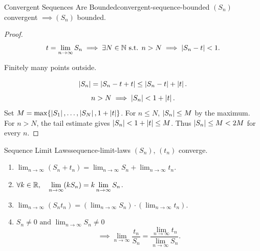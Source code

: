 \begin{theorem}{Convergent Sequences Are Bounded}{convergent-sequence-bounded}
  $(S_n)$ convergent $\implies (S_n)$ bounded.
\end{theorem}

\begin{proof}
  \[
    t=\lim_{n\to\infty}S_n
    \implies\exists N\in\mathbb{N}\text{ s.t. }n>N\implies\left\lvert S_n-t \right\rvert<1.
  \]
  \begin{thinking}[Why]
    \begin{center}
    \end{center}
    Finitely many points outside.
  \end{thinking}
  \[
    \left\lvert S_n \right\rvert=\left\lvert S_n-t+t \right\rvert\le\left\lvert S_n-t \right\rvert+\left\lvert t \right\rvert.
  \]
  \[
    n>N\implies\left\lvert S_n \right\rvert<1+\left\lvert t \right\rvert.
  \]
  Set $M=\max\{\left\lvert S_1 \right\rvert,\ldots,\left\lvert S_N \right\rvert,1+\left\lvert t \right\rvert\}$.
  For $n\le N$, $\left\lvert S_n \right\rvert\le M$ by the maximum.
  For $n>N$, the tail estimate gives $\left\lvert S_n \right\rvert<1+\left\lvert t \right\rvert\le M$.
  Thus $\left\lvert S_n \right\rvert\le M<2M$ for every $n$.
\end{proof}

\begin{theorem}{Sequence Limit Laws}{sequence-limit-laws}
  $(S_n)$, $(t_n)$ converge.
  \begin{enumerate}[label=(\roman*)]
    \item $\displaystyle\lim_{n\to\infty}(S_n+t_n)
            =\lim_{n\to\infty}S_n+\lim_{n\to\infty}t_n$.
    \item $\displaystyle\forall k\in\mathbb{R},\quad\lim_{n\to\infty}(kS_n)
            =k\lim_{n\to\infty}S_n$.
    \item $\displaystyle\lim_{n\to\infty}(S_nt_n)
            =\left(\lim_{n\to\infty}S_n\right)\cdot\left(\lim_{n\to\infty}t_n\right)$.
    \item $\displaystyle S_n\ne0\text{ and }\lim_{n\to\infty}S_n\ne0$
          \[
            \implies\lim_{n\to\infty}\frac{t_n}{S_n}
            =\frac{\lim_{n\to\infty}t_n}{\lim_{n\to\infty}S_n}.
          \]
  \end{enumerate}
\end{theorem}

